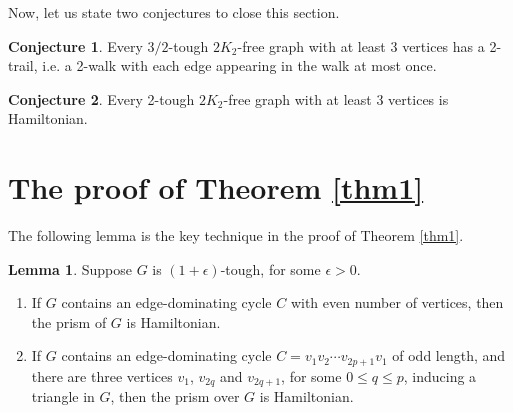 \documentclass{amsart}
\theoremstyle{definition}
\newtheorem{conjecture}{Conjecture}
\newtheorem{lemma}{Lemma}
\begin{document}
\medskip

Now, let us state two conjectures to close this section.
\begin{conjecture}
Every $3/2$-tough $2K_2$-free graph with at least 3 vertices has a 2-trail, i.e. a 2-walk with each edge appearing in the walk at most once.
\end{conjecture}


\begin{conjecture}
Every 2-tough $2K_2$-free graph with at least 3 vertices is Hamiltonian.
\end{conjecture}









\section{The proof of Theorem \ref{thm1}}

The following lemma is the key technique in the proof of Theorem \ref{thm1}.
\begin{lemma}\label{keylem}
Suppose $G$ is $(1+\epsilon)$-tough, for some $\epsilon>0$.
\begin{enumerate}
\item If $G$ contains an edge-dominating cycle $C$ with even number of vertices, then the prism of $G$ is Hamiltonian.
\item If $G$ contains an edge-dominating cycle $C=v_1v_2\cdots v_{2p+1}v_1$ of odd length, and there are three vertices $v_1$, $v_{2q}$ and $v_{2q+1}$, for some $0\le q\le p$, inducing a triangle in $G$, then the prism over $G$ is Hamiltonian.
\end{enumerate}
\end{lemma}
\end{document}
